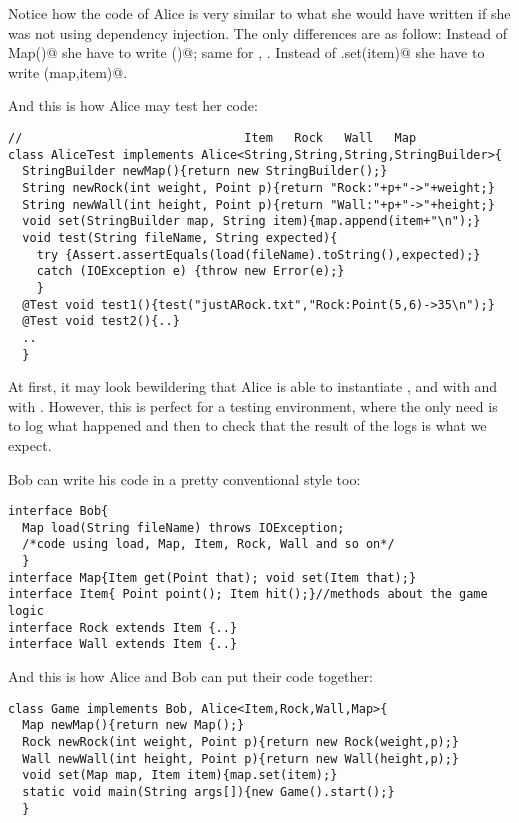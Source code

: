 \documentclass[submission,copyright,creativecommons]{eptcs}
\begin{document}
Notice how the code of Alice is very similar to what she would have written
if she was not using dependency injection. The
only differences are as follow:
Instead of \Q@new Map()@ she have to write \Q@newMap()@; same for
\Q@Rock@, \Q@Wall@.
Instead of \Q@map.set(item)@ she have to write \Q@set(map,item)@.

And this is how Alice may test her code:
\begin{lstlisting}
//                               Item   Rock   Wall   Map
class AliceTest implements Alice<String,String,String,StringBuilder>{
  StringBuilder newMap(){return new StringBuilder();}
  String newRock(int weight, Point p){return "Rock:"+p+"->"+weight;}
  String newWall(int height, Point p){return "Wall:"+p+"->"+height;}
  void set(StringBuilder map, String item){map.append(item+"\n");}
  void test(String fileName, String expected){
    try {Assert.assertEquals(load(fileName).toString(),expected);}
    catch (IOException e) {throw new Error(e);}
    }
  @Test void test1(){test("justARock.txt","Rock:Point(5,6)->35\n");}
  @Test void test2(){..}
  ..
  }
\end{lstlisting}
At first, it may look bewildering that Alice is able to instantiate
\Q@Item@, \Q@Rock@ and \Q@Wall@ with \Q@String@ and \Q@Map@ with
\Q@StringBuilder@. However, this is perfect for a testing environment, where
the only need is to log what happened and then to check that the result
of the logs is what we expect.

Bob can write his code in a pretty conventional style too:
\begin{lstlisting}
interface Bob{
  Map load(String fileName) throws IOException;
  /*code using load, Map, Item, Rock, Wall and so on*/
  }
interface Map{Item get(Point that); void set(Item that);}
interface Item{ Point point(); Item hit();}//methods about the game logic
interface Rock extends Item {..}
interface Wall extends Item {..}
\end{lstlisting}
And this is how Alice and Bob can put their code together:

\begin{lstlisting}
class Game implements Bob, Alice<Item,Rock,Wall,Map>{
  Map newMap(){return new Map();}
  Rock newRock(int weight, Point p){return new Rock(weight,p);}
  Wall newWall(int height, Point p){return new Wall(height,p);}
  void set(Map map, Item item){map.set(item);}
  static void main(String args[]){new Game().start();}
  }
\end{lstlisting}
\end{document}
